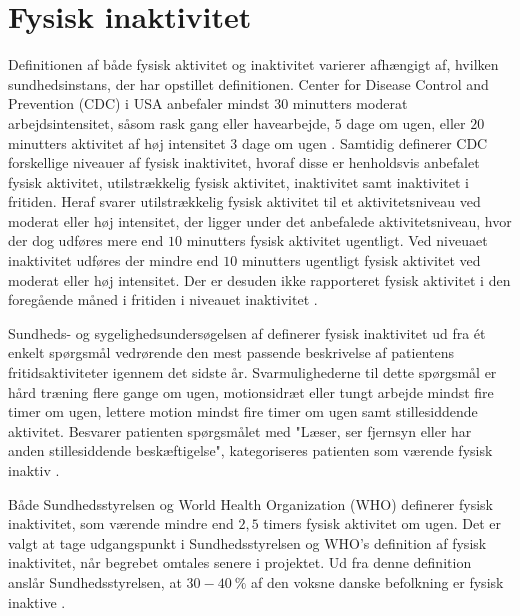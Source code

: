 \section{Fysisk inaktivitet} \label{sec:fys_inaktivitet}

Definitionen af både fysisk aktivitet og inaktivitet varierer afhængigt af, hvilken sundhedsinstans, der har opstillet definitionen. Center for Disease Control and Prevention (CDC) i USA anbefaler mindst $30$ minutters moderat arbejdsintensitet, såsom rask gang eller havearbejde, $5$ dage om ugen, eller $20$ minutters aktivitet af høj intensitet $3$ dage om ugen \citep{motionsraad2007,christensen2012}.
Samtidig definerer CDC forskellige niveauer af fysisk inaktivitet, hvoraf disse er henholdsvis anbefalet fysisk aktivitet, utilstrækkelig fysisk aktivitet, inaktivitet samt inaktivitet i fritiden. Heraf svarer utilstrækkelig fysisk aktivitet til et aktivitetsniveau ved moderat eller høj intensitet, der ligger under det anbefalede aktivitetsniveau, hvor der dog udføres mere end $10$ minutters fysisk aktivitet ugentligt. Ved niveuaet inaktivitet udføres der mindre end $10$ minutters ugentligt fysisk aktivitet ved moderat eller høj intensitet. Der er desuden ikke rapporteret fysisk aktivitet i den foregående måned i fritiden i niveauet inaktivitet  \citep{motionsraad2007,christensen2012}.

Sundheds- og sygelighedsundersøgelsen af \citeauthor{christensen2012} definerer fysisk inaktivitet ud fra ét enkelt spørgsmål vedrørende den mest passende beskrivelse af patientens fritidsaktiviteter igennem det sidste år. Svarmulighederne til dette spørgsmål er hård træning flere gange om ugen, motionsidræt eller tungt arbejde mindst fire timer om ugen, lettere motion mindst fire timer om ugen samt stillesiddende aktivitet. Besvarer patienten spørgsmålet med "Læser, ser fjernsyn eller har anden stillesiddende beskæftigelse", kategoriseres patienten som værende fysisk inaktiv \citep{motionsraad2007,christensen2012}.

Både Sundhedsstyrelsen og World Health Organization (WHO) definerer fysisk inaktivitet, som værende mindre end $2,5$ timers fysisk aktivitet om ugen. Det er valgt at tage udgangspunkt i Sundhedsstyrelsen og WHO's definition af fysisk inaktivitet, når begrebet omtales senere i projektet. Ud fra denne definition anslår Sundhedsstyrelsen, at $30-40~\%$ af den voksne danske befolkning er fysisk inaktive \citep{motionsraad2007}. 